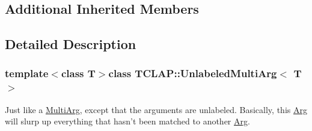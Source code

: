 \subsection*{Additional Inherited Members}


\subsection{Detailed Description}
\subsubsection*{template$<$class T$>$class T\+C\+L\+A\+P\+::\+Unlabeled\+Multi\+Arg$<$ T $>$}

Just like a \hyperlink{class_t_c_l_a_p_1_1_multi_arg}{Multi\+Arg}, except that the arguments are unlabeled. Basically, this \hyperlink{class_t_c_l_a_p_1_1_arg}{Arg} will slurp up everything that hasn't been matched to another \hyperlink{class_t_c_l_a_p_1_1_arg}{Arg}. 

